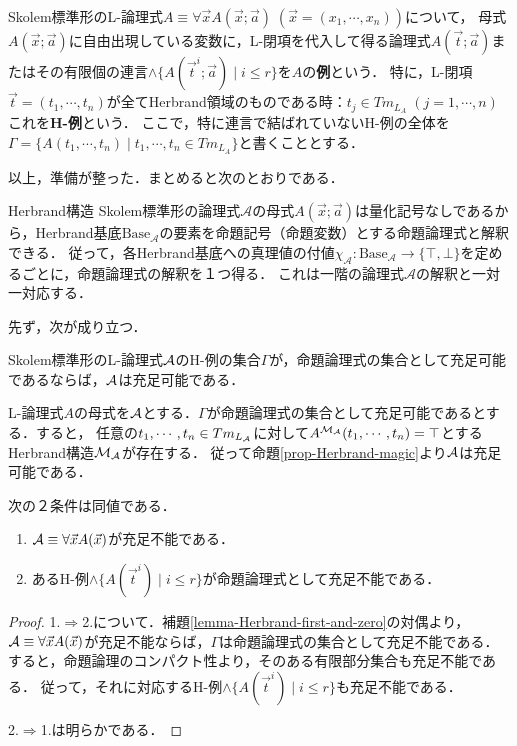 \documentclass[uplatex, 12pt, dvipdfmx]{jsreport}
\begin{document}
\begin{definition}[H-instance]
    Skolem標準形のL-論理式$A\equiv \forall\vec{x}A(\vec{x};\vec{a})\;(\vec{x}=(x_1,\cdots,x_n))$について，
    母式$A(\vec{x};\vec{a})$に自由出現している変数に，L-閉項を代入して得る論理式$A(\vec{t};\vec{a})$またはその有限個の連言$\land\{A(\vec{t}^i;\vec{a})\mid i\le r\}$を$A$の\textbf{例}という．
    特に，L-閉項$\vec{t}=(t_1,\cdots,t_n)$が全てHerbrand領域のものである時：$t_j\in Tm_{L_A}\;(j=1,\cdots,n)$これを\textbf{H-例}という．
    ここで，特に連言で結ばれていないH-例の全体を$\Gamma=\{A(t_1,\cdots,t_n)\mid t_1,\cdots,t_n\in Tm_{L_A}\}$と書くこととする．
\end{definition}

以上，準備が整った．まとめると次のとおりである．
\begin{itembox}[l]{Herbrand構造}
    Skolem標準形の論理式$\mathcal{A}$の母式$A(\vec{x};\vec{a})$は量化記号なしであるから，Herbrand基底$\mathrm{Base}_\mathcal{A}$の要素を命題記号（命題変数）とする命題論理式と解釈できる．
    従って，各Herbrand基底への真理値の付値$\chi_\mathcal{A}:\mathrm{Base}_\mathcal{A}\to\{\top,\bot\}$を定めるごとに，命題論理式の解釈を１つ得る．
    これは一階の論理式$\mathcal{A}$の解釈と一対一対応する．
\end{itembox}

先ず，次が成り立つ．
\begin{lemma}\label{lemma-Herbrand-first-and-zero}
    Skolem標準形のL-論理式$\mathcal{A}$のH-例の集合$\Gamma$が，命題論理式の集合として充足可能であるならば，$\mathcal{A}$は充足可能である．
\end{lemma}
\begin{remark}
    L-論理式$A$の母式を$\mathcal{A}$とする．$\Gamma$が命題論理式の集合として充足可能であるとする．すると，
    任意の$t_1,\cdots,t_n\in Tm_{L_{\mathcal{A}}}$に対して$A^{\mathcal{M}_{\mathcal{A}}}(t_1,\cdots,t_n)=\top$とするHerbrand構造$\mathcal{M}_{\mathcal{A}}$が存在する．
    従って命題\ref{prop-Herbrand-magic}より$\mathcal{A}$は充足可能である．
\end{remark}

\begin{theorem}
    次の２条件は同値である．
    \begin{enumerate}
        \item $\mathcal{A}\equiv\forall\vec{x}A(\vec{x})$が充足不能である．
        \item あるH-例$\land\{A(\vec{t}^i)\mid i\le r\}$が命題論理式として充足不能である．
    \end{enumerate}
\end{theorem}
\begin{proof}
    1.$\Rightarrow$2.について．補題\ref{lemma-Herbrand-first-and-zero}の対偶より，
    $\mathcal{A}\equiv\forall\vec{x}A(\vec{x})$が充足不能ならば，$\Gamma$は命題論理式の集合として充足不能である．
    すると，命題論理のコンパクト性より，そのある有限部分集合も充足不能である．
    従って，それに対応するH-例$\land\{A(\vec{t}^i)\mid i\le r\}$も充足不能である．

    2.$\Rightarrow$1.は明らかである．
\end{proof}
\end{document}
